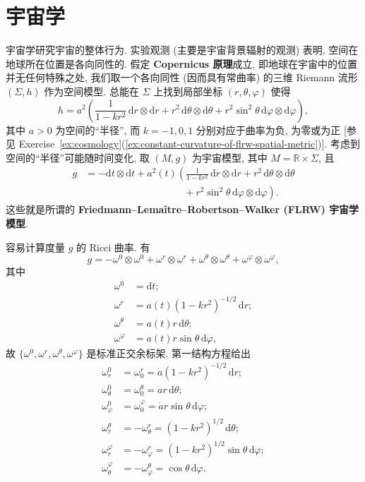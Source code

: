 \section{宇宙学}\label{sec:cosmology}

宇宙学研究宇宙的整体行为. 实验观测 (主要是宇宙背景辐射的观测) 表明, 空间在地球所在位置是各向同性的. 假定 \textbf{Copernicus 原理}成立, 即地球在宇宙中的位置并无任何特殊之处, 我们取一个各向同性 (因而具有常曲率) 的三维 Riemann 流形 $(\Sigma,h)$ 作为空间模型. 总能在 $\Sigma$ 上找到局部坐标 $(r,\theta,\varphi)$ 使得
\[
  h=a^2\left(\frac{1}{1-kr^2}\,\mathrm{d}r\otimes\mathrm{d}r
     +r^2\,\mathrm{d}\theta\otimes\mathrm{d}\theta
     +r^2\sin^2\theta\,\mathrm{d}\varphi\otimes\mathrm{d}\varphi\right),
\]
其中 $a>0$ 为空间的\textquotedblleft 半径\textquotedblright, 而 $k=-1,0,1$ 分别对应于曲率为负, 为零或为正 [参见 Exercise~\ref{ex:cosmology}(\ref{ex:constant-curvature-of-flrw-spatial-metric})]. 考虑到空间的\textquotedblleft 半径\textquotedblright 可能随时间变化, 取 $(M,g)$ 为宇宙模型, 其中 $M=\mathbb{R}\times\Sigma$, 且
\begin{align*}
  g&=-\mathrm{d}t\otimes\mathrm{d}t+a^2(t)
       \left(\frac{1}{1-kr^2}\,\mathrm{d}r\otimes\mathrm{d}r
          +r^2\,\mathrm{d}\theta\otimes\mathrm{d}\theta\right.\\
   &\qquad\qquad\qquad\qquad\qquad
       \left.{}+r^2\sin^2\theta\,\mathrm{d}\varphi\otimes\mathrm{d}\varphi\right).
\end{align*}
这些就是所谓的 \textbf{Friedmann–Lemaître–Robertson–Walker (FLRW) 宇宙学模型}.

容易计算度量 $g$ 的 Ricci 曲率. 有
\[
  g=-\omega^0\otimes\omega^0+\omega^r\otimes\omega^r
    +\omega^\theta\otimes\omega^\theta+\omega^\varphi\otimes\omega^\varphi,
\]
其中
\begin{align*}
  \omega^0&=\mathrm{d}t;\\
  \omega^r&=a(t)(1-kr^2)^{-1/2}\,\mathrm{d}r;\\
  \omega^\theta&=a(t)r\,\mathrm{d}\theta;\\
  \omega^\varphi&=a(t)r\sin\theta\,\mathrm{d}\varphi,
\end{align*}
故 $\{\omega^0,\omega^r,\omega^\theta,\omega^\varphi\}$ 是标准正交余标架. 第一结构方程给出
\begin{align*}
  \omega_r^0&=\omega_0^r=\dot a(1-kr^2)^{-1/2}\,\mathrm{d}r;\\
  \omega_\theta^0&=\omega_0^\theta=\dot a r\,\mathrm{d}\theta;\\
  \omega_\varphi^0&=\omega_0^\varphi=\dot a r\sin\theta\,\mathrm{d}\varphi;\\
  \omega_r^\theta&=-\omega_\theta^r=(1-kr^2)^{1/2}\,\mathrm{d}\theta;\\
  \omega_r^\varphi&=-\omega_\varphi^r=(1-kr^2)^{1/2}\sin\theta\,\mathrm{d}\varphi;\\
  \omega_\theta^\varphi&=-\omega_\varphi^\theta=\cos\theta\,\mathrm{d}\varphi.
\end{align*}

